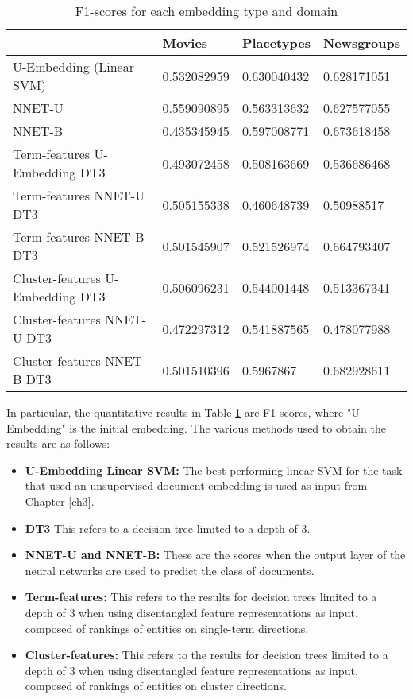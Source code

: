 \begin{table}[]
	\centering
\begin{tabular}{llll}
		& \textbf{Movies}      & \textbf{Placetypes}  & \textbf{Newsgroups}  \\
	\toprule
	U-Embedding (Linear SVM)   & 0.532082959 & 0.630040432 & 0.628171051 \\
	NNET-U                      & 0.559090895 & 0.563313632 & 0.627577055 \\
	NNET-B                      & 0.435345945 & 0.597008771 & 0.673618458 \\
	Term-features U-Embedding DT3 & 0.493072458 & 0.508163669 & 0.536686468 \\
	Term-features NNET-U DT3       & 0.505155338 & 0.460648739 & 0.50988517  \\
	Term-features NNET-B DT3       & 0.501545907 & 0.521526974 & 0.664793407 \\
	Cluster-features U-Embedding DT3   & 0.506096231 & 0.544001448 & 0.513367341 \\
	Cluster-features NNET-U DT3         & 0.472297312 & 0.541887565 & 0.478077988 \\
	Cluster-features NNET-B DT3         & 0.501510396 & 0.5967867   & 0.682928611
\end{tabular}\caption{F1-scores for each embedding type and domain}\label{ch5:quantresults}
\end{table}

In particular, the quantitative results in Table \ref{ch5:quantresults} are F1-scores, where "U-Embedding" is the initial embedding. The various methods used to obtain the results are as follows:

\begin{itemize}
	\item \textbf{U-Embedding Linear SVM:} The best performing linear SVM for the task that used an unsupervised document embedding is used as input  from Chapter \ref{ch3}.
	\item \textbf{DT3} This refers to a decision tree limited to a depth of 3.
	\item \textbf{NNET-U and NNET-B:} These are the scores when the output layer of the neural networks are used to predict the class of documents. 
	\item \textbf{Term-features:} This refers to the results for decision trees limited to a depth of 3 when using  disentangled feature representations as input, composed of rankings of entities on single-term directions.
	\item \textbf{Cluster-features:} This refers to the results for decision trees limited to a depth of 3 when using  disentangled feature representations as input, composed of rankings of entities on cluster directions.
\end{itemize}

